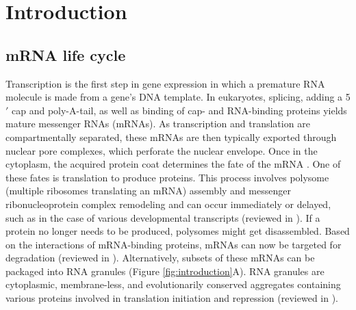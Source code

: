 \chapter{Introduction}


\section{mRNA life cycle}

Transcription is the first step in gene expression in which a premature RNA molecule is made from a gene's DNA template.
In eukaryotes, splicing, adding a 5$'$ cap and poly-A-tail, as well as binding of cap- and RNA-binding proteins yields mature messenger RNAs (mRNAs).
As transcription and translation are compartmentally separated, these mRNAs are then typically exported through nuclear pore complexes, which perforate the nuclear envelope.
Once in the cytoplasm, the acquired protein coat determines the fate of the mRNA \cite{moore_birth_2005}.
One of these fates is translation to produce proteins.
This process involves polysome (multiple ribosomes translating an mRNA) assembly and messenger ribonucleoprotein complex remodeling and can occur immediately or delayed, such as in the case of various developmental transcripts (reviewed in \cite{swinburne_intron_2008}).
If a protein no longer needs to be produced, polysomes might get disassembled.
Based on the interactions of mRNA-binding proteins, mRNAs can now be targeted for degradation (reviewed in \cite{schoenberg_regulation_2012}).
Alternatively, subsets of these mRNAs can be packaged into RNA granules (Figure \ref{fig:introduction}A).
RNA granules are cytoplasmic, membrane-less, and evolutionarily conserved aggregates containing various proteins involved in translation initiation and repression (reviewed in \cite{anderson_rna_2006}).

